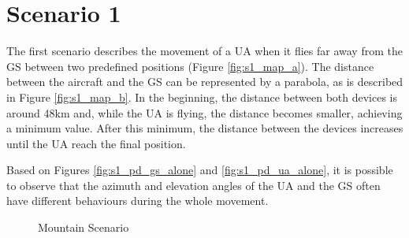 \section{Scenario 1}\label{sec:scenario1}
The first scenario describes the movement of a UA when it flies far away from the GS between two predefined positions (Figure \ref{fig:s1_map_a}). The distance between the aircraft and the GS can be represented by a parabola, as is described in Figure \ref{fig:s1_map_b}. In the beginning, the distance between both devices is around 48km and, while the UA is flying, the distance becomes smaller, achieving a minimum value. After this minimum, the distance between the devices increases until the UA reach the final position.

Based on Figures \ref{fig:s1_pd_gs_alone} and \ref{fig:s1_pd_ua_alone}, it is possible to observe that the azimuth and elevation angles of the UA and the GS often have different behaviours during the whole movement. 
  

\begin{figure}[H]
	\hfill
	\hfill
	\hfill
	\caption{Mountain Scenario}
	\label{fig:s1_map}
\end{figure}


